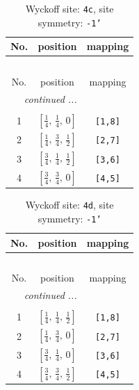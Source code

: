 \documentclass[fleqn,8pt]{jsarticle}
\begin{document}
\renewcommand{\arraystretch}{1.2}
\begin{longtable}{ccc}
\caption{Wyckoff site: {\tt 4c}, site symmetry: {\tt -1'}}
 \\
 \hline \hline
No. & position & mapping \\ \hline \endfirsthead

\multicolumn{2}{l}{\tablename\ \thetable{}} \\
 \hline \hline
No. & position & mapping \\ \hline \endhead

 \hline \hline
\multicolumn{2}{r}{\footnotesize\it continued ...} \\ \endfoot

 \hline \hline
\multicolumn{2}{r}{} \\ \endlastfoot

1 & $\left[ \frac{1}{4},\, \frac{1}{4},\, 0 \right]$ & {\tt [1,8]} \\ \hline
2 & $\left[ \frac{1}{4},\, \frac{3}{4},\, \frac{1}{2} \right]$ & {\tt [2,7]} \\ \hline
3 & $\left[ \frac{3}{4},\, \frac{1}{4},\, \frac{1}{2} \right]$ & {\tt [3,6]} \\ \hline
4 & $\left[ \frac{3}{4},\, \frac{3}{4},\, 0 \right]$ & {\tt [4,5]} \\
\end{longtable}
\renewcommand{\arraystretch}{1.2}
\begin{longtable}{ccc}
\caption{Wyckoff site: {\tt 4d}, site symmetry: {\tt -1'}}
 \\
 \hline \hline
No. & position & mapping \\ \hline \endfirsthead

\multicolumn{2}{l}{\tablename\ \thetable{}} \\
 \hline \hline
No. & position & mapping \\ \hline \endhead

 \hline \hline
\multicolumn{2}{r}{\footnotesize\it continued ...} \\ \endfoot

 \hline \hline
\multicolumn{2}{r}{} \\ \endlastfoot

1 & $\left[ \frac{1}{4},\, \frac{1}{4},\, \frac{1}{2} \right]$ & {\tt [1,8]} \\ \hline
2 & $\left[ \frac{1}{4},\, \frac{3}{4},\, 0 \right]$ & {\tt [2,7]} \\ \hline
3 & $\left[ \frac{3}{4},\, \frac{1}{4},\, 0 \right]$ & {\tt [3,6]} \\ \hline
4 & $\left[ \frac{3}{4},\, \frac{3}{4},\, \frac{1}{2} \right]$ & {\tt [4,5]} \\
\end{longtable}
\end{document}
